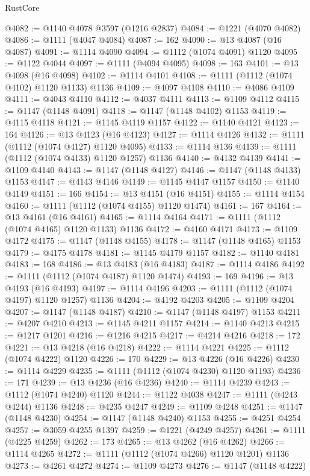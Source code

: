 \begin{lexlean}{RustCore}
\begin{coremodule}
@4082 := @1140 @4078 @3597 (@1216 @2837)
@4084 := @1221 (@4070 @4082)
@4086 := @1111 (@4047 @4084)
@4087 := 162
@4090 := @13 @4087 (@16 @4087)
@4091 := @1114 @4090
@4094 := @1112 (@1074 @4091) @1120
@4095 := @1122 @4044
@4097 := @1111 (@4094 @4095)
@4098 := 163
@4101 := @13 @4098 (@16 @4098)
@4102 := @1114 @4101
@4108 := @1111 (@1112 (@1074 @4102) @1120 @1133) @1136
@4109 := @4097 @4108
@4110 := @4086 @4109
@4111 := @4043 @4110
@4112 := @4037 @4111
@4113 := @1109 @4112
@4115 := @1147 (@1148 @4091)
@4118 := @1147 (@1148 @4102) @1153
@4119 := @4115 @4118
@4121 := @1145 @4119 @1157
@4122 := @1140 @4121
@4123 := 164
@4126 := @13 @4123 (@16 @4123)
@4127 := @1114 @4126
@4132 := @1111 (@1112 (@1074 @4127) @1120 @4095)
@4133 := @1114 @136
@4139 := @1111 (@1112 (@1074 @4133) @1120 @1257) @1136
@4140 := @4132 @4139
@4141 := @1109 @4140
@4143 := @1147 (@1148 @4127)
@4146 := @1147 (@1148 @4133) @1153
@4147 := @4143 @4146
@4149 := @1145 @4147 @1157
@4150 := @1140 @4149
@4151 := 166
@4154 := @13 @4151 (@16 @4151)
@4155 := @1114 @4154
@4160 := @1111 (@1112 (@1074 @4155) @1120 @1474)
@4161 := 167
@4164 := @13 @4161 (@16 @4161)
@4165 := @1114 @4164
@4171 := @1111 (@1112 (@1074 @4165) @1120 @1133) @1136
@4172 := @4160 @4171
@4173 := @1109 @4172
@4175 := @1147 (@1148 @4155)
@4178 := @1147 (@1148 @4165) @1153
@4179 := @4175 @4178
@4181 := @1145 @4179 @1157
@4182 := @1140 @4181
@4183 := 168
@4186 := @13 @4183 (@16 @4183)
@4187 := @1114 @4186
@4192 := @1111 (@1112 (@1074 @4187) @1120 @1474)
@4193 := 169
@4196 := @13 @4193 (@16 @4193)
@4197 := @1114 @4196
@4203 := @1111 (@1112 (@1074 @4197) @1120 @1257) @1136
@4204 := @4192 @4203
@4205 := @1109 @4204
@4207 := @1147 (@1148 @4187)
@4210 := @1147 (@1148 @4197) @1153
@4211 := @4207 @4210
@4213 := @1145 @4211 @1157
@4214 := @1140 @4213
@4215 := @1217 @1201
@4216 := @1216 @4215
@4217 := @4214 @4216
@4218 := 172
@4221 := @13 @4218 (@16 @4218)
@4222 := @1114 @4221
@4225 := @1112 (@1074 @4222) @1120
@4226 := 170
@4229 := @13 @4226 (@16 @4226)
@4230 := @1114 @4229
@4235 := @1111 (@1112 (@1074 @4230) @1120 @1193)
@4236 := 171
@4239 := @13 @4236 (@16 @4236)
@4240 := @1114 @4239
@4243 := @1112 (@1074 @4240) @1120
@4244 := @1122 @4038
@4247 := @1111 (@4243 @4244) @1136
@4248 := @4235 @4247
@4249 := @1109 @4248
@4251 := @1147 (@1148 @4230)
@4254 := @1147 (@1148 @4240) @1153
@4255 := @4251 @4254
@4257 := @3059 @4255 @1397
@4259 := @1221 (@4249 @4257)
@4261 := @1111 (@4225 @4259)
@4262 := 173
@4265 := @13 @4262 (@16 @4262)
@4266 := @1114 @4265
@4272 := @1111 (@1112 (@1074 @4266) @1120 @1201) @1136
@4273 := @4261 @4272
@4274 := @1109 @4273
@4276 := @1147 (@1148 @4222)

\end{coremodule}
\end{lexlean}
